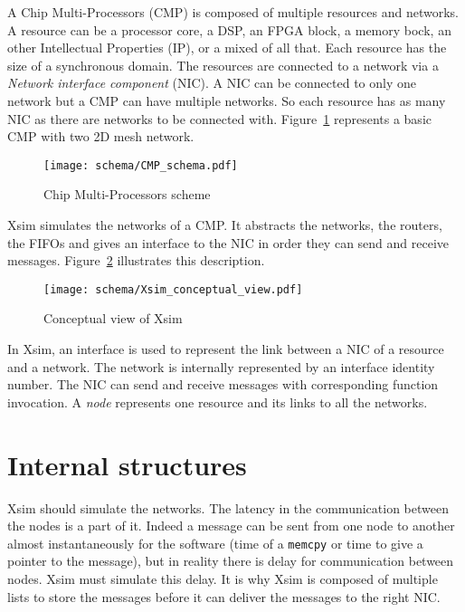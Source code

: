 A Chip Multi-Processors (CMP) is composed of multiple resources and networks.
A resource can be a processor core, a DSP, an FPGA block, a memory bock, 
an other Intellectual Properties (IP), or a mixed of all that. Each resource 
has the size of a synchronous domain.
The resources are connected to a network via a \emph{Network interface 
component} (NIC). A NIC can be connected to only one network but a CMP can have 
multiple networks. So each resource has as
many NIC as there are networks to be connected with. Figure~\ref{CMP_schema} 
represents a basic CMP with two 2D mesh network.

\begin{figure}[h]
\begin{center}
    \texttt{[image: schema/CMP\_schema.pdf]}
	\caption{Chip Multi-Processors scheme}
	\label{CMP_schema}
\end{center}
\end{figure}


Xsim simulates the networks of a CMP. It abstracts the networks, the routers, 
the FIFOs and gives an interface to the NIC in order they can send and receive
messages. Figure~\ref{Xsim_conceptual_view} illustrates this description.

\begin{figure}[h]
\begin{center}
    \texttt{[image: schema/Xsim\_conceptual\_view.pdf]}
	\caption{Conceptual view of Xsim}
	\label{Xsim_conceptual_view}
\end{center}
\end{figure}


In Xsim, an interface is used to represent the link between a NIC of a resource
and a network. The network is internally represented by an interface identity
number. The NIC can send and receive messages with corresponding function invocation.
A \emph{node} represents one resource and its links to all the networks.


\section{Internal structures}
Xsim should simulate the networks. The latency in the communication between 
the nodes is a part of it. Indeed
a message can be sent from one node to another almost instantaneously for the 
software (time of a \verb|memcpy| or time to give a pointer to the message), 
but in reality there is delay for 
communication between nodes. Xsim must simulate this delay. It is why
Xsim is composed of multiple lists to store the messages before it can deliver
the messages to the right NIC. 

